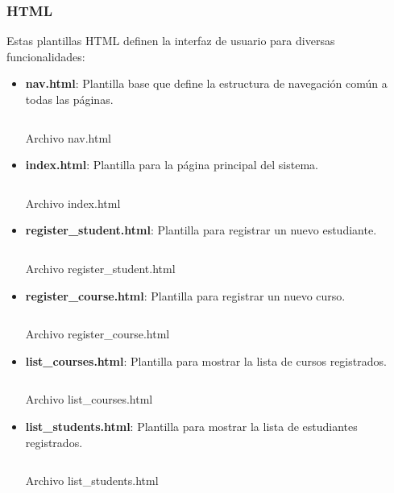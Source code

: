 \documentclass{article}
\newenvironment{block}{\captionsetup{type=listing}}{}
\begin{document}
\subsubsection{HTML}
Estas plantillas HTML definen la interfaz de usuario para diversas funcionalidades:
\begin{itemize}
	\item \textbf{nav.html}: Plantilla base que define la estructura de navegación común a todas las páginas.
	      \begin{block}
		      \inputminted{html}{../Course_Management_System/systemM/templates/nav.html}
		      \caption{Archivo nav.html}
	      \end{block}

	\item \textbf{index.html}: Plantilla para la página principal del sistema.
	      \begin{block}
		      \inputminted{html}{../Course_Management_System/systemM/templates/index.html}
		      \caption{Archivo index.html}
	      \end{block}

	\item \textbf{register\_student.html}: Plantilla para registrar un nuevo estudiante.
	      \begin{block}
		      \inputminted{html}{../Course_Management_System/systemM/templates/register_student.html}
		      \caption{Archivo register\_student.html}
	      \end{block}

	\item \textbf{register\_course.html}: Plantilla para registrar un nuevo curso.
	      \begin{block}
		      \inputminted{html}{../Course_Management_System/systemM/templates/register_course.html}
		      \caption{Archivo register\_course.html}
	      \end{block}

	\item \textbf{list\_courses.html}: Plantilla para mostrar la lista de cursos registrados.
	      \begin{block}
		      \inputminted{html}{../Course_Management_System/systemM/templates/list_courses.html}
		      \caption{Archivo list\_courses.html}
	      \end{block}

	\item \textbf{list\_students.html}: Plantilla para mostrar la lista de estudiantes registrados.
	      \begin{block}
		      \inputminted{html}{../Course_Management_System/systemM/templates/list_students.html}
		      \caption{Archivo list\_students.html}
	      \end{block}


\end{itemize}
\end{document}
